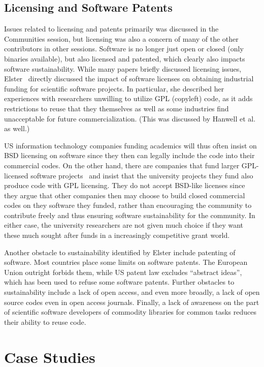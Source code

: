 \documentclass[11pt, oneside]{amsart}
\newcommand{\note}[1]{ {\textcolor{red}    { #1 }}}
\begin{document}
\subsection{Licensing and Software Patents}
Issues related to licensing and patents primarily was discussed in the Communities
session, but licensing was also a concern of many of the other contributors
in other sessions.
%
Software is no longer just open or closed (only binaries available),
but also licensed and patented, which clearly also impacts 
software sustainability.
While many papers briefly discussed licensing issues,
Elster~\cite{Elster_WSSSPE} directly discussed the impact of software licenses 
on obtaining industrial funding for scientific software
projects.  In particular, she described her experiences with researchers
unwilling to utilize GPL (copyleft) code, as it adds restrictions to
reuse that they themselves as well as some industries find unacceptable for future
commercialization.  (This was discussed by Hanwell et
al.~\cite{Hanwell_WSSSPE} as well.)

US information technology companies funding 
academics will thus often insist on BSD licensing on software 
since they then can legally include the code into their commercial
codes.
%
On the other hand, there are companies
that fund larger GPL-licensed software projects~\cite{Blatt_WSSSPE}
and insist that the university projects they fund 
also produce code with GPL licensing.
They do not accept BSD-like licenses since they argue that
other companies then may choose to build closed commercial
codes on they software they funded, rather than encouraging 
the community to contribute freely and thus ensuring software 
sustainability for the community.
%
In either case, the university researchers are not given much choice
if they want these much sought after funds in a increasingly competitive
grant world.

Another obstacle to
sustainability identified by Elster include patenting of software.
Most countries place some limits on software patents. The European 
Union outright forbids them, while US patent law excludes ``abstract ideas'', 
which has been used to refuse some software patents.
%
Further obstacles to
sustainability include a lack of open access, and even more broadly, a lack of open source
codes even in open access journals.  Finally, a lack of awareness on
the part of scientific software developers of commodity libraries for
common tasks reduces their ability to reuse code.

\section{Case Studies} \label{sec:use-cases} %
\end{document}
